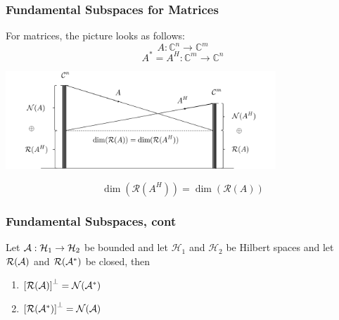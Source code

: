 \documentclass{beamer}
\begin{document}
\begin{frame}\frametitle{Fundamental Subspaces for Matrices}
	For matrices, the picture looks as follows:
	\[ A:\mathbb{C}^n \to \mathbb{C}^m \]
	\[ A^\ast = A^H: \mathbb{C}^m \to \mathbb{C}^n\]
	\begin{center}
		\includegraphics[width=4in]{figures/chap4_fundamental_subspace_matrices}
	\end{center}
	\[\dim(\mathcal{R}(A^H)) = \dim(\mathcal{R}(A))\]
\end{frame}

\begin{frame}\frametitle{Fundamental Subspaces, cont}
	\begin{theorem}	
		Let $\mathcal{A}: \mathcal{H}_1 \to \mathcal{H}_2$ be bounded and let $\mathcal{H}_1$ and $\mathcal{H}_2$ be Hilbert spaces and let $\mathcal{R}(\mathcal{A})$ and $\mathcal{R}(\mathcal{A}^\ast)$ be closed, then
		\begin{enumerate}
		\item $\left[ \mathcal{R}(\mathcal{A}) \right]^{\perp} = \mathcal{N}(\mathcal{A}^\ast) $
		\item $\left[ \mathcal{R}(\mathcal{A}^\ast) \right]^{\perp} = \mathcal{N}(\mathcal{A}) $
		\end{enumerate}	
	\end{theorem}
\end{frame}
\end{document}
